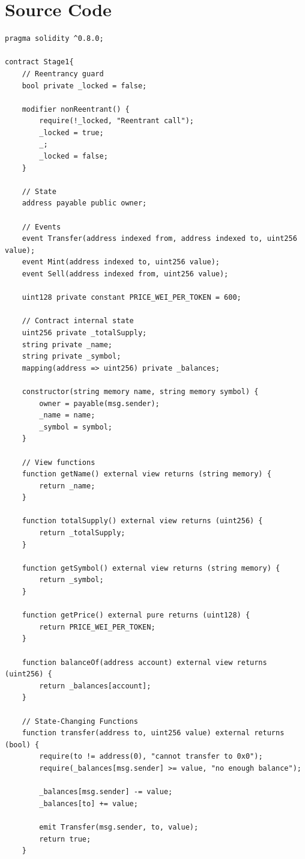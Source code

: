 \documentclass[10pt,a4paper]{article}
\begin{document}
\section{Source Code}
\begin{lstlisting}
pragma solidity ^0.8.0;

contract Stage1{
    // Reentrancy guard
    bool private _locked = false;
    
    modifier nonReentrant() {
        require(!_locked, "Reentrant call");
        _locked = true;
        _;
        _locked = false;
    }
    
    // State 
    address payable public owner;
    
    // Events
    event Transfer(address indexed from, address indexed to, uint256 value);
    event Mint(address indexed to, uint256 value);
    event Sell(address indexed from, uint256 value);

    uint128 private constant PRICE_WEI_PER_TOKEN = 600;

    // Contract internal state
    uint256 private _totalSupply;
    string private _name;
    string private _symbol;
    mapping(address => uint256) private _balances;

    constructor(string memory name, string memory symbol) {
        owner = payable(msg.sender);
        _name = name;
        _symbol = symbol;
    }

    // View functions
    function getName() external view returns (string memory) {
        return _name;
    }

    function totalSupply() external view returns (uint256) {
        return _totalSupply;
    }

    function getSymbol() external view returns (string memory) {
        return _symbol;
    }

    function getPrice() external pure returns (uint128) {
        return PRICE_WEI_PER_TOKEN;
    }

    function balanceOf(address account) external view returns (uint256) {
        return _balances[account];
    }

    // State-Changing Functions
    function transfer(address to, uint256 value) external returns (bool) {
        require(to != address(0), "cannot transfer to 0x0");
        require(_balances[msg.sender] >= value, "no enough balance");

        _balances[msg.sender] -= value;
        _balances[to] += value;

        emit Transfer(msg.sender, to, value);
        return true;
    }


\end{lstlisting}
\end{document}
